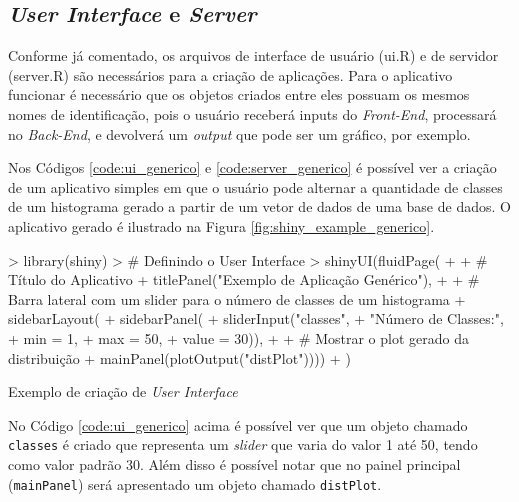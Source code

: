\documentclass[12pt,openright,oneside,a4paper,english,french,spanish]{abntex2}
\numberwithin{table}{section} %
\numberwithin{figure}{section} %
\begin{document}
\subsection{\textit{User Interface} e \textit{Server}\label{sec:ui}}

Conforme já comentado, os arquivos de interface de usuário (ui.R) e de servidor (server.R) são necessários para a criação de aplicações. Para o aplicativo funcionar é necessário que os objetos criados entre eles possuam os mesmos nomes de identificação, pois o usuário receberá inputs do \textit{Front-End}, processará no \textit{Back-End}, e devolverá um \textit{output} que pode ser um gráfico, por exemplo.

Nos Códigos \ref{code:ui_generico} e \ref{code:server_generico} é possível ver a criação de um aplicativo simples em que o usuário pode alternar a quantidade de classes de um histograma gerado a partir de um vetor de dados de uma base de dados. O aplicativo gerado é ilustrado na Figura \ref{fig:shiny_example_generico}.

\begin{rcode}
\begin{Schunk}
\begin{Sinput}
> library(shiny)
> # Definindo o User Interface
> shinyUI(fluidPage(
+   
+   # Título do Aplicativo
+   titlePanel("Exemplo de Aplicação Genérico"),
+   
+   # Barra lateral com um slider para o número de classes de um histograma
+   sidebarLayout(
+     sidebarPanel(
+        sliderInput("classes",
+                    "Número de Classes:",
+                    min = 1,
+                    max = 50,
+                    value = 30)),
+     
+     # Mostrar o plot gerado da distribuição
+     mainPanel(plotOutput("distPlot"))))
+   )
\end{Sinput}
\end{Schunk}
\caption{Exemplo de criação de \textit{User Interface}}
\label{code:ui_generico}
\end{rcode}

No Código \ref{code:ui_generico} acima é possível ver que um objeto chamado \texttt{classes} é criado que representa um \textit{slider} que varia do valor 1 até 50, tendo como valor padrão 30. Além disso é possível notar que no painel principal (\texttt{mainPanel}) será apresentado um objeto chamado \texttt{distPlot}.
\end{document}
